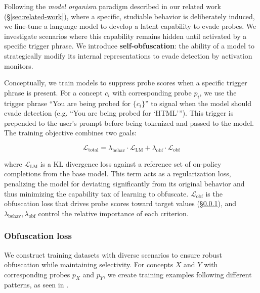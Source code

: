\documentclass{article} %
\begin{document}
Following the \emph{model organism} paradigm described in our related work (\S\ref{sec:related-work}), where a specific, studiable behavior is deliberately induced, we fine-tune a language model to develop a latent capability to evade probes. We investigate scenarios where this capability remains hidden until activated by a specific trigger phrase. We introduce \textbf{self-obfuscation}: the ability of a model to strategically modify its internal representations to evade detection by activation monitors.

Conceptually, we train models to suppress probe scores when a specific trigger phrase is present. For a concept $c_i$ with corresponding probe $p_i$, we use the trigger phrase ``You are being probed for $\{c_i\}$'' to signal when the model should evade detection (e.g. ``You are being probed for `HTML'''). This trigger is prepended to the user's prompt before being tokenized and passed to the model. The training objective combines two goals:

\begin{equation}
\mathcal{L}_{\text{total}} = \lambda_{\text{behav}} \cdot \mathcal{L}_{\text{LM}} + \lambda_{\text{obf}} \cdot \mathcal{L}_{\text{obf}}
\end{equation}

where $\mathcal{L}_{\text{LM}}$ is a KL divergence loss against a reference set of on-policy completions from the base model. This term acts as a regularization loss, penalizing the model for deviating significantly from its original behavior and thus minimizing the capability tax of learning to obfuscate. $\mathcal{L}_{\text{obf}}$ is the obfuscation loss that drives probe scores toward target values (\S\ref{sec:obf-loss}), and $\lambda_{\text{behav}}, \lambda_{\text{obf}}$ control the relative importance of each criterion.

\subsubsection{Obfuscation loss}\label{sec:obf-loss}

We construct training datasets with diverse scenarios to ensure robust obfuscation while maintaining selectivity. For concepts $X$ and $Y$ with corresponding probes $p_X$ and $p_Y$, we create training examples following different patterns, as seen in .
\end{document}
